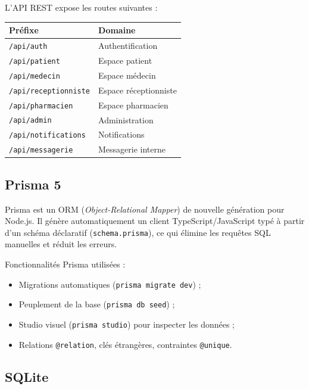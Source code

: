 \documentclass[12pt, a4paper]{report}
\begin{document}
\medskip

L'API REST expose les routes suivantes :

\begin{center}
\begin{tabular}{ll}
  \toprule
  \textbf{Préfixe} & \textbf{Domaine} \\
  \midrule
  \texttt{/api/auth}           & Authentification \\
  \texttt{/api/patient}        & Espace patient \\
  \texttt{/api/medecin}        & Espace médecin \\
  \texttt{/api/receptionniste} & Espace réceptionniste \\
  \texttt{/api/pharmacien}     & Espace pharmacien \\
  \texttt{/api/admin}          & Administration \\
  \texttt{/api/notifications}  & Notifications \\
  \texttt{/api/messagerie}     & Messagerie interne \\
  \bottomrule
\end{tabular}
\end{center}

\subsection{Prisma 5}

Prisma est un ORM (\textit{Object-Relational Mapper}) de nouvelle génération
pour Node.js. Il génère automatiquement un client TypeScript/JavaScript typé
à partir d'un schéma déclaratif (\texttt{schema.prisma}), ce qui élimine
les requêtes SQL manuelles et réduit les erreurs.

\medskip

Fonctionnalités Prisma utilisées :
\begin{itemize}
  \item Migrations automatiques (\texttt{prisma migrate dev}) ;
  \item Peuplement de la base (\texttt{prisma db seed}) ;
  \item Studio visuel (\texttt{prisma studio}) pour inspecter les données ;
  \item Relations \texttt{@relation}, clés étrangères, contraintes \texttt{@unique}.
\end{itemize}

\subsection{SQLite}
\end{document}
